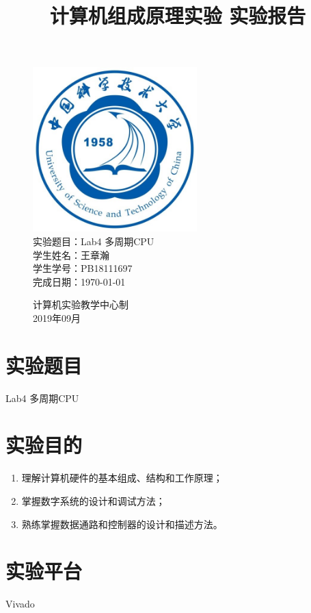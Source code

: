 \documentclass[UTF8]{article}
\title{计算机组成原理实验 实验报告}
\date{}
\begin{document}
\maketitle
\begin{figure}[H]
	\centering
	\includegraphics[width=2.5in]{xiaohui.png}\vspace{0.5cm}\\
	\large{
		实验题目：Lab4 多周期CPU\\
		学生姓名：王章瀚\\
		学生学号：PB18111697\\
		完成日期：\today\\
	}\vspace{2cm}
	
	\large{计算机实验教学中心制\\2019年09月\\}
	\thispagestyle{empty}
	\clearpage  %
\end{figure}
\newpage

\section{实验题目}
Lab4 多周期CPU

\section{实验目的}
\begin{enumerate}
	\item 理解计算机硬件的基本组成、结构和工作原理；
	\item 掌握数字系统的设计和调试方法；
	\item 熟练掌握数据通路和控制器的设计和描述方法。
\end{enumerate}

\section{实验平台}
Vivado
\end{document}
